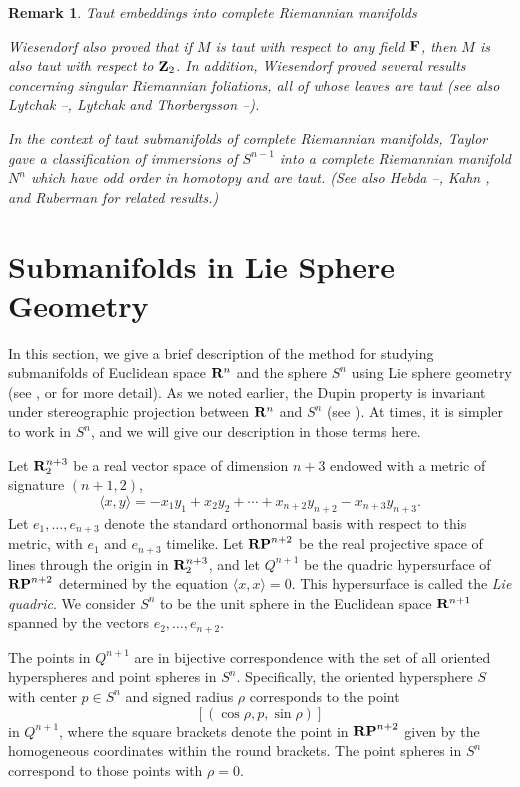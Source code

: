 \documentclass[12pt]{article}
\newtheorem{remark}{Remark}[section]
\begin{document}
{\begin{remark}{Taut embeddings into complete Riemannian manifolds}
{Wiesendorf also proved that if $M$ is taut with respect to any field ${\bf F}$, then $M$ is also taut with respect to 
${\bf Z}_2$.  In addition, Wiesendorf proved several results concerning singular Riemannian foliations, 
all of whose leaves are taut (see also Lytchak \cite{Lytchak-09}--\cite{Lytchak-10},  
Lytchak and Thorbergsson \cite{LT}--\cite{LT-10}). 


In the context of taut submanifolds of complete Riemannian manifolds, Taylor \cite{Taylor-2000} gave a classification of immersions of $S^{n-1}$ into a complete
Riemannian manifold $N^n$ which have odd order in homotopy and are taut. (See also Hebda \cite{Heb1}--\cite{Heb1a},  Kahn \cite{Kahn},
and Ruberman \cite{Ruberman} for related results.)} 
\end{remark}




\section{Submanifolds in Lie Sphere Geometry}
\label{sec:submanifolds-lie-geometry}
 
In this section,
we give a brief description of the method for studying submanifolds
of Euclidean space ${\bf R}^n$ and the sphere $S^n$ using Lie sphere geometry (see
\cite{Cec9}, \cite{CC1} or \cite{P2} for more detail).  
As we noted
earlier, the Dupin property is invariant under stereographic
projection between ${\bf R}^n$ and $S^n$ (see \cite[pp. 147--148]{CR7}).
At times, it is simpler to work in $S^n$, and we will give our
description in those terms here. 

Let ${\bf R}_2^{n+3}$ be a real vector space of
dimension $n+3$ endowed with a metric of signature $(n+1,2)$,
\begin{equation}
\label{eq:lie-metric}
\langle x,y \rangle = -x_1 y_1 + x_2 y_2 + \cdots +x_{n+2} y_{n+2} -
x_{n+3} y_{n+3}.
\end{equation}
Let $e_1, \ldots ,e_{n+3}$ denote the standard orthonormal
basis with respect to this metric, with $e_1$ and $e_{n+3}$
timelike.  Let ${\bf RP}^{n+2}$ be the real projective space of lines through
the origin in ${\bf R}_2^{n+3}$,  and let $Q^{n+1}$ be the quadric
hypersurface of ${\bf RP}^{n+2}$ determined by the equation $\langle x,x \rangle = 0$.  This
hypersurface is called the {\em Lie quadric}.
We consider $S^n$ to be the unit sphere in the Euclidean space
${\bf R}^{n+1}$ spanned by the vectors $e_2, \ldots , e_{n+2}$.

The points in $Q^{n+1}$ are in bijective correspondence
with the set of all oriented hyperspheres and point
spheres in $S^n$.  Specifically,
the oriented hypersphere $S$ with center $p \in S^n$ and
signed radius $\rho$ corresponds to the point
\begin{equation}
\label{eq:lie-sphere-in-sphere}
[(\cos \rho , p, \sin \rho )]
\end{equation} in $Q^{n+1}$, where the 
square brackets denote the point in ${\bf RP}^{n+2}$ given by the
homogeneous coordinates within the round brackets.  The point
spheres in $S^n$ correspond to those points with $\rho = 0$.

}
\end{document}
